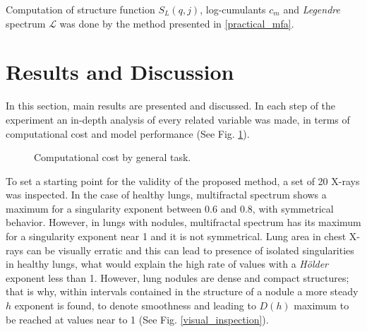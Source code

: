 \documentclass{article}
\begin{document}
Computation of structure function $S_L(q, j)$, log-cumulants $c_m$ and \textit{Legendre} spectrum $\mathcal{L}$ was done by the method presented in \ref{practical_mfa}.


\section{Results and Discussion} 

In this section, main results are presented and discussed. In each step of the experiment an in-depth analysis of every related variable was made, in terms of computational cost and model performance (See Fig. \ref{comp_cost}). 

\begin{figure}[ht]
	\centering
	\caption{Computational cost by general task.} \label{comp_cost}
\end{figure}


To set a starting point for the validity of the proposed method, a set of 20 X-rays was inspected. In the case of healthy lungs, multifractal spectrum shows a maximum for a singularity exponent between $0.6$ and $0.8$, with symmetrical behavior. However, in lungs with nodules, multifractal spectrum has its maximum for a singularity exponent near 1 and it is not symmetrical. Lung area in chest X-rays can be visually erratic and this can lead to presence of isolated singularities in healthy lungs, what would explain the high rate of values with a \textit{H\"older} exponent less than 1. However, lung nodules are dense and compact structures; that is why, within intervals contained in the structure of a nodule a more steady $h$ exponent is found, to denote smoothness and leading to $D(h)$ maximum to be reached at values near to 1 (See Fig. \ref{visual_inspection}).
\end{document}
